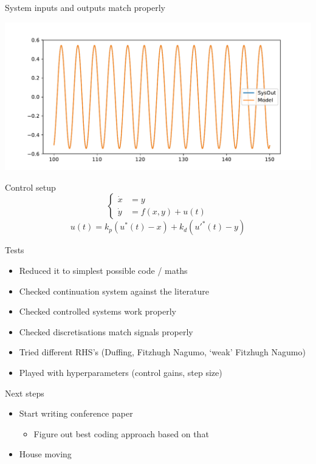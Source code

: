 \documentclass[presentation]{beamer}
\begin{document}
\begin{frame}[label={sec:org02806d8}]{System inputs and outputs match properly}
\begin{center}
\includegraphics[width=.9\linewidth]{./trial.pdf}
\end{center}
\end{frame}

\begin{frame}[label={sec:orgb2f175c}]{Control setup}
\[\begin{cases}
      \dot{x} &= y \\
      \dot{y} &= f(x,y) + u(t)
     \end{cases}\]
\vfill
\[u(t) = k_p(u^*(t) - x) + k_d(u'^{\ast}(t) - y)\]
\end{frame}

\begin{frame}[label={sec:orgceb85a9}]{Tests}
\begin{itemize}
\item Reduced it to simplest possible code / maths
\item Checked continuation system against the literature
\item Checked controlled systems work properly
\item Checked discretisations match signals properly
\item Tried different RHS's (Duffing, Fitzhugh Nagumo, `weak' Fitzhugh Nagumo)
\item Played with hyperparameters (control gains, step size)
\end{itemize}
\end{frame}

\begin{frame}[label={sec:org6f9a341}]{Next steps}
\begin{itemize}
\item Start writing conference paper
\begin{itemize}
\item Figure out best coding approach based on that
\end{itemize}
\item House moving
\end{itemize}
\end{frame}
\end{document}
